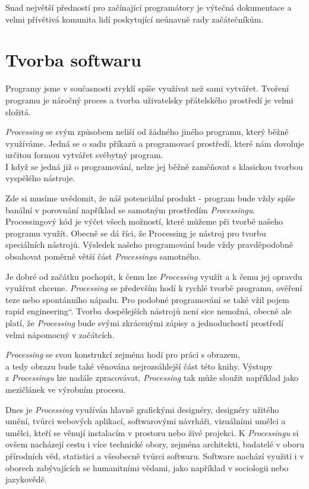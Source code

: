 \documentclass[10pt,twoside=true,open=right,cleardoublepage=empty,chapterprefix=true]{scrbook}
\renewcommand\uv[1]{\quotedblbase #1\textquotedblleft}%
\newcommand{\oddil}[1]{\section{#1}\index{#1}\label{#1}}
\begin{document}
Snad největší předností pro začínající programátory je výtečná dokumentace a velmi přívětivá komunita lidí poskytující neúnavně rady začátečníkům.


\oddil{Tvorba softwaru}

Programy jsme v současnosti zvyklí spíše využívat než sami vytvářet. Tvoření programu je náročný proces a tvorba uživatelsky přátelského prostředí je velmi složitá.

{\em Processing} se svým způsobem neliší od žádného jiného programu, který běžně využíváme. Jedná se o sadu příkazů a programovací prostředí, které nám dovoluje určitou formou vytvářet svébytný program. \\ I když se jedná již o programování, nelze jej běžně zaměňovat s klasickou tvorbou vyspělého nástroje.

Zde si musíme uvědomit, že náš potenciální produkt - program bude vždy spíše banální v porovnání například se samotným prostředím {\em Processingu}. Processingový kód je výčet všech možností, které můžeme při tvorbě našeho programu využít. Obecně se dá říci, že Processing je nástroj pro tvorbu speciálních nástrojů. Výsledek našeho programování bude vždy pravděpodobně obsahovat poměrně větší část {\em Processingu} samotného.

Je dobré od začátku pochopit, k čemu lze {\em Processing} využít a k čemu jej opravdu využívat chceme. {\em Processing} se především hodí k rychlé tvorbě programu, ověření teze nebo spontánního nápadu. Pro podobné programování se také vžil pojem \uv{rapid engineering}. Tvorba dospělejších nástrojů není sice nemožná, obecně ale platí, že {\em Processing} bude svými zkrácenými zápisy a jednoduchostí prostředí velmi nápomocný v začátcích. 

{\em Processing} se svou konstrukcí zejména hodí pro práci s obrazem, \\ a tedy obrazu bude také věnována nejrozsáhlejší část této knihy. Výstupy \\ z {\em Processingu} lze nadále zpracovávat, {\em Processing} tak může sloužit například jako mezičlánek ve výrobním procesu.

Dnes je {\em Processing} využíván hlavně grafickými designéry, designéry užitého umění, tvůrci webových aplikací, softwarovými návrháři, vizuálními umělci a umělci, kteří se věnují instalacím v prostoru nebo živé projekci. K {\em Processingu} si ovšem nacházejí cestu i více technické obory, zejména architekti, badatelé v oboru přírodních věd, statistici a všeobecně tvůrci softwaru. Software nachází využití i v oborech zabývajících se humanitními vědami, jako například v sociologii nebo jazykovědě.
\end{document}
